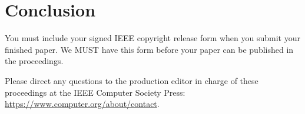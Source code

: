 \section{Conclusion}

You must include your signed IEEE copyright release form when you submit your finished paper.
We MUST have this form before your paper can be published in the proceedings.

Please direct any questions to the production editor in charge of these proceedings at the IEEE Computer Society Press:
\url{https://www.computer.org/about/contact}.